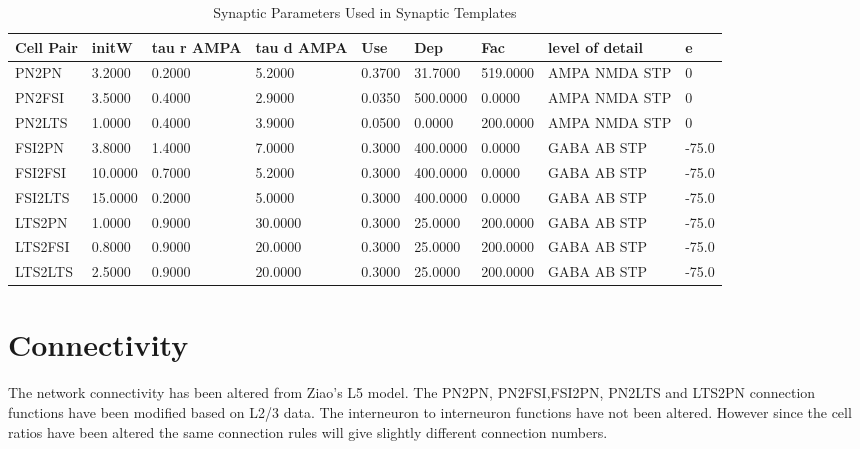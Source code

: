 \documentclass[12pt, letterpaper]{article}
\begin{document}
\begin{table}[H]
  \centering
  \caption{Synaptic Parameters Used in Synaptic Templates}
  \begin{tabularx}{\textwidth}{|X|X|X|X|X|X|X|X|X}
    \hline
    Cell Pair & initW & tau r AMPA & tau d AMPA & Use & Dep & Fac & level of detail & e \\ \hline
    PN2PN & 3.2000 & 0.2000 & 5.2000 & 0.3700 & 31.7000 & 519.0000 & AMPA NMDA STP & 0 \\ \hline
    PN2FSI & 3.5000 & 0.4000 & 2.9000 & 0.0350 & 500.0000 & 0.0000 & AMPA NMDA STP & 0 \\ \hline
    PN2LTS & 1.0000 & 0.4000 & 3.9000 & 0.0500 & 0.0000 & 200.0000 & AMPA NMDA STP & 0 \\ \hline
    FSI2PN & 3.8000 & 1.4000 & 7.0000 & 0.3000 & 400.0000 & 0.0000 & GABA AB STP & -75.0  \\ \hline
    FSI2FSI & 10.0000 & 0.7000 & 5.2000 & 0.3000 & 400.0000 & 0.0000 & GABA AB STP & -75.0 \\ \hline
    FSI2LTS & 15.0000 & 0.2000 & 5.0000 & 0.3000 & 400.0000 & 0.0000 & GABA AB STP & -75.0 \\ \hline
    LTS2PN & 1.0000 & 0.9000 & 30.0000 & 0.3000 & 25.0000 & 200.0000 & GABA AB STP & -75.0 \\ \hline
    LTS2FSI & 0.8000 & 0.9000 & 20.0000 & 0.3000 & 25.0000 & 200.0000 & GABA AB STP & -75.0 \\ \hline
    LTS2LTS & 2.5000 & 0.9000 & 20.0000 & 0.3000 & 25.0000 & 200.0000 & GABA AB STP & -75.0 \\ \hline
  \end{tabularx}
  \label{tab:syn_prop}
\end{table}





\section*{Connectivity}
The network connectivity has been altered from Ziao's L5 model. 
The PN2PN\cite{Holmgren2003}, PN2FSI\cite{Holmgren2003},FSI2PN\cite{Holmgren2003}, PN2LTS\cite{Pala2015}\cite{Kapfer2007} and LTS2PN\cite{Fino2011} connection functions have been modified based on L2/3 data. 
The interneuron to interneuron functions have not been altered.
However since the cell ratios have been altered the same connection rules will give slightly different connection numbers. 
\end{document}
